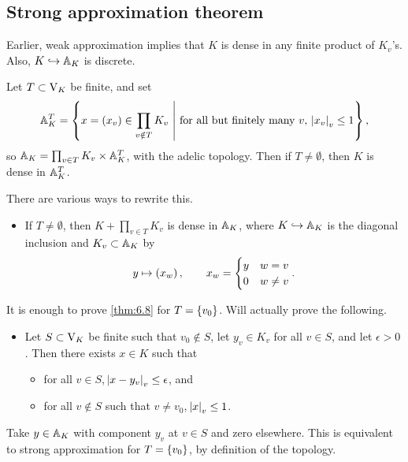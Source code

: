\pagebreak

\subsection{Strong approximation theorem}

Earlier, weak approximation implies that $ K $ is dense in any finite product of $ K_v $'s. Also, $ K \hookrightarrow \AA_K $ is discrete.

\begin{theorem}
\label{thm:6.8}
Let $ T \subset \V_K $ be finite, and set
$$ \AA_K^T = \cbr{x = \br{x_v} \in \prod_{v \notin T} K_v \st \text{for all but finitely many} \ v, \ \abs{x_v}_v \le 1}, $$
so $ \AA_K = \prod_{v \in T} K_v \times \AA_K^T $, with the adelic topology. Then if $ T \ne \emptyset $, then $ K $ is dense in $ \AA_K^T $.
\end{theorem}

There are various ways to rewrite this.
\begin{itemize}
\item If $ T \ne \emptyset $, then $ K + \prod_{v \in T} K_v $ is dense in $ \AA_K $, where $ K \hookrightarrow \AA_K $ is the diagonal inclusion and $ K_v \subset \AA_K $ by
$$ y \mapsto \br{x_w}, \qquad x_w =
\begin{cases}
y & w = v \\
0 & w \ne v
\end{cases}.
$$
\end{itemize}
It is enough to prove \ref{thm:6.8} for $ T = \cbr{v_0} $. Will actually prove the following.
\begin{itemize}
\item Let $ S \subset \V_K $ be finite such that $ v_0 \notin S $, let $ y_v \in K_v $ for all $ v \in S $, and let $ \epsilon > 0 $. Then there exists $ x \in K $ such that
\begin{itemize}
\item for all $ v \in S $, $ \abs{x - y_v}_v \le \epsilon $, and
\item for all $ v \notin S $ such that $ v \ne v_0 $, $ \abs{x}_v \le 1 $.
\end{itemize}
\end{itemize}
Take $ y \in \AA_K $ with component $ y_v $ at $ v \in S $ and zero elsewhere. This is equivalent to strong approximation for $ T = \cbr{v_0} $, by definition of the topology.


